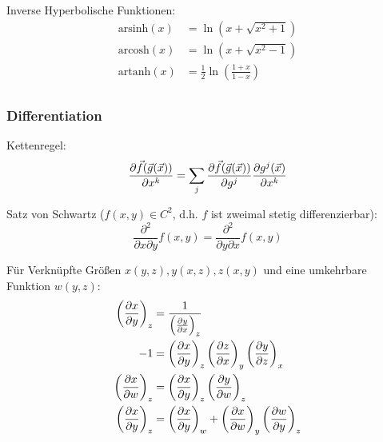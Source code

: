 			\noindent
			Inverse Hyperbolische Funktionen:
			\begin{equation}
				\begin{aligned}
					\mathrm{arsinh}(x) &= \ln\left(x+\sqrt{x^2+1}\right) \\
					\mathrm{arcosh}(x) &= \ln\left(x+\sqrt{x^2-1}\right) \\
					\mathrm{artanh}(x) &= \frac{1}{2}\ln\left(\frac{1+x}{1-x}\right) \\
				\end{aligned}
			\end{equation}

		\subsubsection{Differentiation}
			\noindent
			Kettenregel:
			\begin{equation}
				\frac{\partial \vec{f}(\vec{g}(\vec{x}))}{\partial x^k} = \sum_j \frac{\partial  \vec{f}(\vec{g}(\vec{x}))}{\partial g^j} \frac{\partial g^j(\vec{x})}{\partial x^k}
			\end{equation}

			\noindent
			Satz von Schwartz ($f(x,y)\in C^2$, d.h. $f$ ist zweimal stetig differenzierbar):
			\begin{equation}
				\frac{\partial^2 }{\partial x \partial y} f(x,y) = \frac{\partial^2 }{\partial y \partial x} f(x,y)
			\end{equation}

			\noindent
			Für Verknüpfte Größen $x(y,z), y(x,z), z(x,y)$ und eine umkehrbare Funktion $w(y,z)$:
			\begin{equation}
				\begin{aligned}
					\left( \frac{\partial x}{\partial y} \right)_z &= \frac{1}{\left( \frac{\partial y}{\partial x} \right)_z} \\
					-1 &= \left( \frac{\partial x}{\partial y} \right)_z \left( \frac{\partial z}{\partial x} \right)_y \left( \frac{\partial y}{\partial z} \right)_x \\
					\left( \frac{\partial x}{\partial w} \right)_z &= \left( \frac{\partial x}{\partial y} \right)_z \left( \frac{\partial y}{\partial w} \right)_z \\
					\left( \frac{\partial x}{\partial y} \right)_z &= \left( \frac{\partial x}{\partial y} \right)_w + \left( \frac{\partial x}{\partial w} \right)_y \left( \frac{\partial w}{\partial y} \right)_z \\
				\end{aligned}
			\end{equation}


